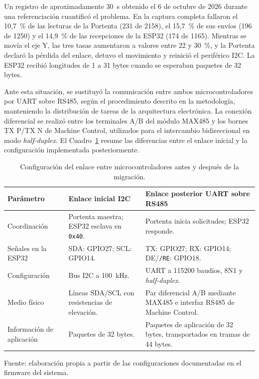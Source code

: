 Un registro de aproximadamente 30~s obtenido el 6 de octubre de 2026 durante una referenciación cuantificó el problema. En la captura completa fallaron el 10,7~\% de las lecturas de la Portenta (231 de 2158), el 15,7~\% de sus envíos (196 de 1250) y el 14,9~\% de las recepciones de la ESP32 (174 de 1165). Mientras se movía el eje Y, las tres tasas aumentaron a valores entre 22 y 30~\%, y la Portenta declaró la pérdida del enlace, detuvo el movimiento y reinició el periférico I2C. La ESP32 recibió longitudes de 1 a 31 bytes cuando se esperaban paquetes de 32 bytes.

Ante esta situación, se sustituyó la comunicación entre ambos microcontroladores por UART sobre RS485, según el procedimiento descrito en la metodología, manteniendo la distribución de tareas de la arquitectura electrónica. La conexión diferencial se realizó entre los terminales A/B del módulo MAX485 y los bornes TX P/TX N de Machine Control, utilizados para el intercambio bidireccional en modo \textit{half-duplex}. El Cuadro~\ref{tab:fase4_comparacion_enlace} resume las diferencias entre el enlace inicial y la configuración implementada posteriormente.

\begin{table}[H]
    \centering
    \caption{Configuración del enlace entre microcontroladores antes y después de la migración.}
    \label{tab:fase4_comparacion_enlace}
    \begin{tabular}{p{}p{}p{}}
        \hline
        Parámetro & Enlace inicial I2C & Enlace posterior UART sobre RS485 \\
        \hline
        Coordinación & Portenta maestra; ESP32 esclava en \texttt{0x40}. & Portenta inicia solicitudes; ESP32 responde. \\
        Señales en la ESP32 & SDA: GPIO27; SCL: GPIO14. & TX: GPIO27; RX: GPIO14; DE/\texttt{/RE}: GPIO18. \\
        Configuración & Bus I2C a 100~kHz. & UART a 115200 baudios, 8N1 y \textit{half-duplex}. \\
        Medio físico & Líneas SDA/SCL con resistencias de elevación. & Par diferencial A/B mediante MAX485 e interfaz RS485 de Machine Control. \\
        Información de aplicación & Paquetes de 32 bytes. & Paquetes de aplicación de 32 bytes, transportados en tramas de 44 bytes. \\
        \hline
    \end{tabular}
    \par\small\raggedright Fuente: elaboración propia a partir de las configuraciones documentadas en el firmware del sistema.
\end{table}

